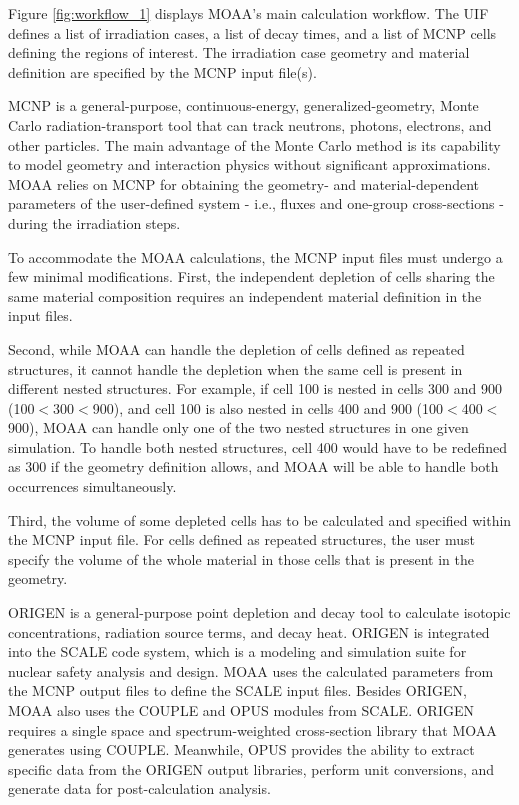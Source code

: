 \documentclass{style/nseJournal}
\begin{document}
Figure \ref{fig:workflow_1} displays MOAA's main calculation workflow.
The \gls*{UIF} defines a list of irradiation cases, a list of decay times, and a list of MCNP cells defining the regions of interest.
The irradiation case geometry and material definition are specified by the MCNP input file(s).

MCNP is a general-purpose, continuous-energy, generalized-geometry, Monte Carlo radiation-transport tool that can track neutrons, photons, electrons, and other particles.
The main advantage of the Monte Carlo method is its capability to model geometry and interaction physics without significant approximations.
MOAA relies on MCNP for obtaining the geometry- and material-dependent parameters of the user-defined system - i.e., fluxes and one-group cross-sections - during the irradiation steps.

To accommodate the MOAA calculations, the MCNP input files must undergo a few minimal modifications.
First, the independent depletion of cells sharing the same material composition requires an independent material definition in the input files.

Second, while MOAA can handle the depletion of cells defined as repeated structures, it cannot handle the depletion when the same cell is present in different nested structures.
For example, if cell 100 is nested in cells 300 and 900 (100$<$300$<$900), and cell 100 is also nested in cells 400 and 900 (100$<$400$<$900), MOAA can handle only one of the two nested structures in one given simulation.
To handle both nested structures, cell 400 would have to be redefined as 300 if the geometry definition allows, and MOAA will be able to handle both occurrences simultaneously.

Third, the volume of some depleted cells has to be calculated and specified within the MCNP input file.
For cells defined as repeated structures, the user must specify the volume of the whole material in those cells that is present in the geometry.

ORIGEN is a general-purpose point depletion and decay tool to calculate isotopic concentrations, radiation source terms, and decay heat.
ORIGEN is integrated into the SCALE code system, which is a modeling and simulation suite for nuclear safety analysis and design.
MOAA uses the calculated parameters from the MCNP output files to define the SCALE input files.
Besides ORIGEN, MOAA also uses the COUPLE and OPUS modules from SCALE.
ORIGEN requires a single space and spectrum-weighted cross-section library that MOAA generates using COUPLE.
Meanwhile, OPUS provides the ability to extract specific data from the ORIGEN output libraries, perform unit conversions, and generate data for post-calculation analysis.
\end{document}
